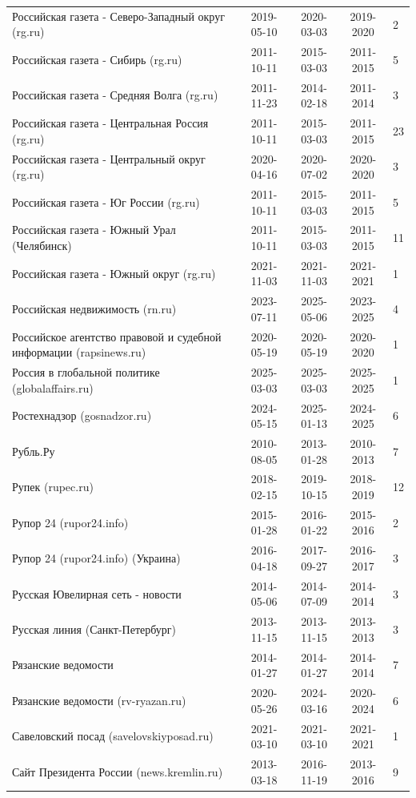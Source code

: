 \begin{longtable}{p{6cm}cccp{2cm}}
Российская газета - Северо-Западный округ (rg.ru) & 2019-05-10 & 2020-03-03 & 2019-2020 & 2\\
Российская газета - Сибирь (rg.ru) & 2011-10-11 & 2015-03-03 & 2011-2015 & 5\\
Российская газета - Средняя Волга (rg.ru) & 2011-11-23 & 2014-02-18 & 2011-2014 & 3\\
Российская газета - Центральная Россия (rg.ru) & 2011-10-11 & 2015-03-03 & 2011-2015 & 23\\
Российская газета - Центральный округ (rg.ru) & 2020-04-16 & 2020-07-02 & 2020-2020 & 3\\
Российская газета - Юг России (rg.ru) & 2011-10-11 & 2015-03-03 & 2011-2015 & 5\\
Российская газета - Южный Урал (Челябинск) & 2011-10-11 & 2015-03-03 & 2011-2015 & 11\\
Российская газета - Южный округ (rg.ru) & 2021-11-03 & 2021-11-03 & 2021-2021 & 1\\
Российская недвижимость (rn.ru) & 2023-07-11 & 2025-05-06 & 2023-2025 & 4\\
Российское агентство правовой и судебной информации (rapsinews.ru) & 2020-05-19 & 2020-05-19 & 2020-2020 & 1\\
Россия в глобальной политике (globalaffairs.ru) & 2025-03-03 & 2025-03-03 & 2025-2025 & 1\\
Ростехнадзор (gosnadzor.ru) & 2024-05-15 & 2025-01-13 & 2024-2025 & 6\\
Рубль.Ру & 2010-08-05 & 2013-01-28 & 2010-2013 & 7\\
Рупек (rupec.ru) & 2018-02-15 & 2019-10-15 & 2018-2019 & 12\\
Рупор 24 (rupor24.info) & 2015-01-28 & 2016-01-22 & 2015-2016 & 2\\
Рупор 24 (rupor24.info) (Украина) & 2016-04-18 & 2017-09-27 & 2016-2017 & 3\\
Русская Ювелирная сеть - новости & 2014-05-06 & 2014-07-09 & 2014-2014 & 3\\
Русская линия (Санкт-Петербург) & 2013-11-15 & 2013-11-15 & 2013-2013 & 3\\
Рязанские ведомости & 2014-01-27 & 2014-01-27 & 2014-2014 & 7\\
Рязанские ведомости (rv-ryazan.ru) & 2020-05-26 & 2024-03-16 & 2020-2024 & 6\\
Савеловский посад (savelovskiyposad.ru) & 2021-03-10 & 2021-03-10 & 2021-2021 & 1\\
Сайт Президента России (news.kremlin.ru) & 2013-03-18 & 2016-11-19 & 2013-2016 & 9\\

\end{longtable}
